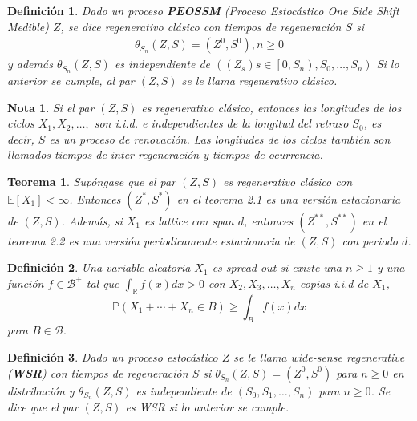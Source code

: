 \documentclass{article}
\newtheorem{Def}{Definición}[section]
\newtheorem{Teo}{Teorema}[section]
\newtheorem{Note}{Nota}[section]
\newcommand{\rea}{\mathbb{R}}
\newcommand{\esp}{\mathbb{E}}
\newcommand{\prob}{\mathbb{P}}
\numberwithin{equation}{section}
\begin{document}
\begin{Def}
Dado un proceso \textbf{PEOSSM} (Proceso Estoc\'astico One Side Shift Medible) $Z$, se dice regenerativo cl\'asico con tiempos de regeneraci\'on $S$ si 
\begin{eqnarray*}
\theta_{S_{n}}\left(Z,S\right)=\left(Z^{0},S^{0}\right),n\geq0
\end{eqnarray*}
y adem\'as $\theta_{S_{n}}\left(Z,S\right)$ es independiente de $\left(\left(Z_{s}\right)s\in\left[0,S_{n}\right),S_{0},\ldots,S_{n}\right)$
Si lo anterior se cumple, al par $\left(Z,S\right)$ se le llama regenerativo cl\'asico.
\end{Def}

\begin{Note}
Si el par $\left(Z,S\right)$ es regenerativo cl\'asico, entonces las longitudes de los ciclos $X_{1},X_{2},\ldots,$ son i.i.d. e independientes de la longitud del retraso $S_{0}$, es decir, $S$ es un proceso de renovaci\'on. Las longitudes de los ciclos tambi\'en son llamados tiempos de inter-regeneraci\'on y tiempos de ocurrencia.
\end{Note}

\begin{Teo}
Sup\'ongase que el par $\left(Z,S\right)$ es regenerativo cl\'asico con $\esp\left[X_{1}\right]<\infty$. Entonces $\left(Z^{*},S^{*}\right)$ en el teorema 2.1 es una versi\'on estacionaria de $\left(Z,S\right)$. Adem\'as, si $X_{1}$ es lattice con span $d$, entonces $\left(Z^{**},S^{**}\right)$ en el teorema 2.2 es una versi\'on periodicamente estacionaria de $\left(Z,S\right)$ con periodo $d$.

\end{Teo}

\begin{Def}
Una variable aleatoria $X_{1}$ es \textit{spread out} si existe una $n\geq1$ y una  funci\'on $f\in\mathcal{B}^{+}$ tal que $\int_{\rea}f\left(x\right)dx>0$ con $X_{2},X_{3},\ldots,X_{n}$ copias i.i.d  de $X_{1}$, $$\prob\left(X_{1}+\cdots+X_{n}\in B\right)\geq\int_{B}f\left(x\right)dx$$ para $B\in\mathcal{B}$.
\end{Def}

\begin{Def}
Dado un proceso estoc\'astico $Z$ se le llama \textit{wide-sense regenerative} (\textbf{WSR}) con tiempos de regeneraci\'on $S$ si $\theta_{S_{n}}\left(Z,S\right)=\left(Z^{0},S^{0}\right)$ para $n\geq0$ en distribuci\'on y $\theta_{S_{n}}\left(Z,S\right)$ es independiente de $\left(S_{0},S_{1},\ldots,S_{n}\right)$ para $n\geq0$.
Se dice que el par $\left(Z,S\right)$ es WSR si lo anterior se cumple.
\end{Def}
\end{document}
